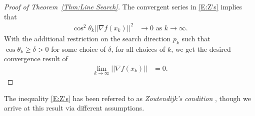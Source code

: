 \documentclass[oneside]{myumnStatThesis}
\begin{document}
\begin{proof}[Proof of Theorem~\ref{Thm:Line Search}]
The convergent series in \eqref{E:Z's} implies that 
\begin{align*}
	\cos^2 \theta_k || \nabla f(x_k) ||^2 &\to 0 \text{ as } k \to \infty.
\end{align*}
With the additional restriction on the search direction $p_k$ such that $\cos \theta_k \geq \delta > 0$ for some choice 
of $\delta$, for all choices of $k$, we get the desired convergence result of
\begin{align*}
	\lim_{k \to \infty} || \nabla f(x_k) || &= 0.
\end{align*}
\end{proof}
The inequality \eqref{E:Z's} has been referred to as \emph{Zoutendijk's condition} \citep{NW}, though we arrive at this 
result via different assumptions.\\  












\newpage
\end{document}
